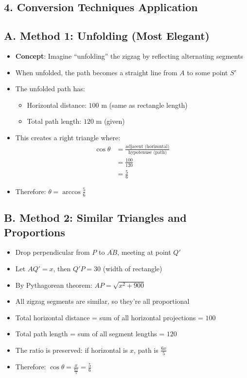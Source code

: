 \documentclass[11pt]{article}
\begin{document}
\begin{conversionbox}
\section*{4. Conversion Techniques Application}

\subsection*{A. Method 1: Unfolding (Most Elegant)}
\begin{itemize}[leftmargin=*]
    \item \textbf{Concept}: Imagine ``unfolding'' the zigzag by reflecting alternating segments
    \item When unfolded, the path becomes a straight line from $A$ to some point $S'$
    \item The unfolded path has:
    \begin{itemize}
        \item Horizontal distance: $100$ m (same as rectangle length)
        \item Total path length: $120$ m (given)
    \end{itemize}
    \item This creates a right triangle where:
    \begin{align*}
    \cos\theta &= \frac{\text{adjacent (horizontal)}}{\text{hypotenuse (path)}}\\
    &= \frac{100}{120}\\
    &= \frac{5}{6}
    \end{align*}
    \item Therefore: $\theta = \arccos\frac{5}{6}$
\end{itemize}

\subsection*{B. Method 2: Similar Triangles and Proportions}
\begin{itemize}[leftmargin=*]
    \item Drop perpendicular from $P$ to $\overline{AB}$, meeting at point $Q'$
    \item Let $AQ' = x$, then $Q'P = 30$ (width of rectangle)
    \item By Pythagorean theorem: $AP = \sqrt{x^2 + 900}$
    \item All zigzag segments are similar, so they're all proportional
    \item Total horizontal distance = sum of all horizontal projections = $100$
    \item Total path length = sum of all segment lengths = $120$
    \item The ratio is preserved: if horizontal is $x$, path is $\frac{6x}{5}$
    \item Therefore: $\cos\theta = \frac{x}{\frac{6x}{5}} = \frac{5}{6}$
\end{itemize}


\end{conversionbox}
\end{document}
